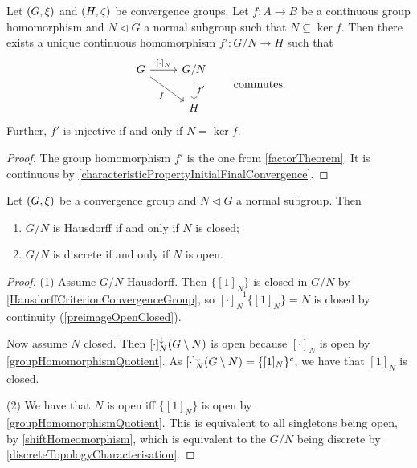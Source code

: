 \begin{lemma}
Let $\left( G, \xi \right)$ and $\left( H, \zeta \right)$ be convergence groups. Let $f: A\to B$ be a continuous group homomorphism and $N\lhd G$ a normal subgroup such that $N\subseteq \ker f$. Then there exists a unique continuous homomorphism $f': G/N \to H$ such that
\[ \begin{tikzcd}
G \arrow[r, "{[\cdot]_N}"] \arrow[dr, swap, "f"] & G/N \arrow[d, dashed, "{f'}"] \\
& H
\end{tikzcd} \qquad\text{commutes.} \]
Further, $f'$ is injective \textup{if and only if} $N = \ker f$.
\end{lemma}
\begin{proof}
The group homomorphism $f'$ is the one from \ref{factorTheorem}. It is continuous by \ref{characteristicPropertyInitialFinalConvergence}.
\end{proof}

\begin{proposition}
Let $\left( G, \xi \right)$ be a convergence group and $N \lhd G$ a normal subgroup. Then 
\begin{enumerate}
\item $G/N$ is Hausdorff \textup{if and only if} $N$ is closed;
\item $G/N$ is discrete \textup{if and only if} $N$ is open.
\end{enumerate}
\end{proposition}
\begin{proof}
(1) Assume $G/N$ Hausdorff. Then $\{[1]_N\}$ is closed in $G/N$ by \ref{HausdorffCriterionConvergenceGroup}, so $[\cdot]_N^{-1}\{[1]_N\} = N$ is closed by continuity (\ref{preimageOpenClosed}).

Now assume $N$ closed. Then $[\cdot]^{\downarrow}_N(G\setminus N)$ is open because $[\cdot]_N$ is open by \ref{groupHomomorphismQuotient}. As $[\cdot]^{\downarrow}_N(G\setminus N) = \{[1]_N\}^c$, we have that $[1]_N$ is closed.

(2) We have that $N$ is open iff $\{[1]_N\}$ is open by \ref{groupHomomorphismQuotient}. This is equivalent to all singletons being open, by \ref{shiftHomeomorphism}, which is equivalent to the $G/N$ being discrete by \ref{discreteTopologyCharacterisation}.
\end{proof}

